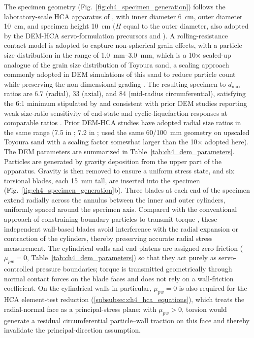 \documentclass[../main]{subfiles}
\begin{document}
The specimen geometry (Fig.~\ref{fig:ch4_specimen_generation}) follows the laboratory-scale HCA apparatus of \citet{Vargas2020}, with inner diameter \SI{6}{cm}, outer diameter \SI{10}{cm}, and specimen height \SI{10}{cm} ($H$ equal to the outer diameter, also adopted by the DEM-HCA servo-formulation precursors \citet{Han2024jgs} and \citet{Ma2024}). A rolling-resistance contact model \citep{IwashitaOda1998,WensrichKatterfeld2012} is adopted to capture non-spherical grain effects, with a particle size distribution in the range of \SIrange{1.0}{3.0}{mm}, which is a 10$\times$ scaled-up analogue of the grain size distribution of Toyoura sand, a scaling approach commonly adopted in DEM simulations of this sand to reduce particle count while preserving the non-dimensional grading \citep{Song2024}. The resulting specimen-to-$d_{\max}$ ratios are 6.7 (radial), 33 (axial), and 84 (mid-radius circumferential), satisfying the 6:1 minimum stipulated by \citet{ASTM_D7181,ASTM_D4767} and consistent with prior DEM studies reporting weak size-ratio sensitivity of end-state and cyclic-liquefaction responses at comparable ratios \citep{Huang2014,KuhnRenken2014}. Prior DEM-HCA studies have adopted radial size ratios in the same range (7.5 in \citealt{Shi2021}; 7.2 in \citealt{Liu2021}; \citealt{Song2024} used the same 60/100~mm geometry on upscaled Toyoura sand with a scaling factor somewhat larger than the 10$\times$ adopted here). The DEM parameters are summarized in Table~\ref{tab:ch4_dem_parameters}. Particles are generated by gravity deposition from the upper part of the apparatus. Gravity is then removed to ensure a uniform stress state, and six torsional blades, each 15~mm tall, are inserted into the specimen (Fig.~\ref{fig:ch4_specimen_generation}b). Three blades at each end of the specimen extend radially across the annulus between the inner and outer cylinders, uniformly spaced around the specimen axis. Compared with the conventional approach of constraining boundary particles to transmit torque \citep[e.g.,][]{LiZhangGutierrez2015,Liu2021}, these independent wall-based blades avoid interference with the radial expansion or contraction of the cylinders, thereby preserving accurate radial stress measurement. The cylindrical walls and end platens are assigned zero friction ($\mu_{pw}=0$, Table~\ref{tab:ch4_dem_parameters}) so that they act purely as servo-controlled pressure boundaries; torque is transmitted geometrically through normal contact forces on the blade faces and does not rely on a wall-friction coefficient. On the cylindrical walls in particular, $\mu_{pw}=0$ is also required for the HCA element-test reduction (\cref{subsubsec:ch4_hca_equations}), which treats the radial-normal face as a principal-stress plane: with $\mu_{pw}>0$, torsion would generate a residual circumferential particle--wall traction on this face and thereby invalidate the principal-direction assumption.
\end{document}
